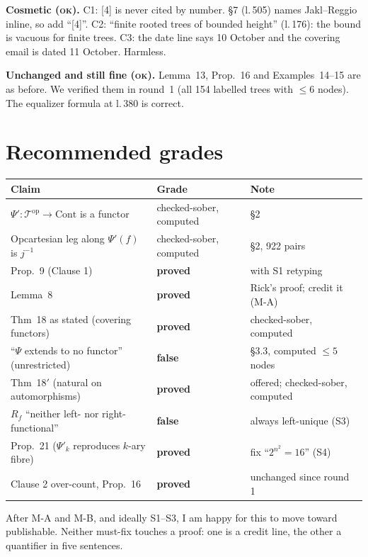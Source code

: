 \documentclass[11pt]{article}
\newcommand{\iss}[1]{\textsc{#1}}
\newcommand{\Cont}{\mathrm{Cont}}
\newcommand{\T}{\mathcal T}
\begin{document}
\textbf{Cosmetic (\iss{ok}).} C1: [4] is never cited by number. \S7 (l.\,505) names Jakl--Reggio
inline, so add ``[4]''. C2: ``finite rooted trees of bounded height'' (l.\,176): the bound is vacuous
for finite trees. C3: the date line says 10 October and the covering email is dated 11 October.
Harmless.

\textbf{Unchanged and still fine (\iss{ok}).} Lemma~13, Prop.~16 and Examples~14--15 are as before.
We verified them in round~1 (all 154 labelled trees with $\le6$ nodes). The equalizer formula at
l.\,380 is correct.

\section{Recommended grades}
\begin{center}\small
\begin{tabular}{p{6.4cm}p{3.0cm}p{6.0cm}}
\toprule
Claim & Grade & Note\\\midrule
$\Psi'\colon\T^{\mathrm{op}}\to\Cont$ is a functor & checked-sober, computed & \S2\\
Opcartesian leg along $\Psi'(f)$ is $j^{-1}$ & checked-sober, computed & \S2, 922 pairs\\
Prop.~9 (Clause 1) & \textbf{proved} & with S1 retyping\\
Lemma~8 & \textbf{proved} & Rick's proof; credit it (M-A)\\
Thm~18 as stated (covering functors) & \textbf{proved} & checked-sober, computed\\
``$\Psi$ extends to no functor'' (unrestricted) & \textbf{false} & \S3.3, computed $\le5$ nodes\\
Thm~18$'$ (natural on automorphisms) & \textbf{proved} & offered; checked-sober, computed\\
$R_f$ ``neither left- nor right-functional'' & \textbf{false} & always left-unique (S3)\\
Prop.~21 ($\Psi'_k$ reproduces $k$-ary fibre) & \textbf{proved} & fix ``$2^{n^2}=16$'' (S4)\\
Clause 2 over-count, Prop.~16 & \textbf{proved} & unchanged since round 1\\
\bottomrule
\end{tabular}
\end{center}
After M-A and M-B, and ideally S1--S3, I am happy for this to move toward publishable. Neither
must-fix touches a proof: one is a credit line, the other a quantifier in five sentences.
\end{document}
